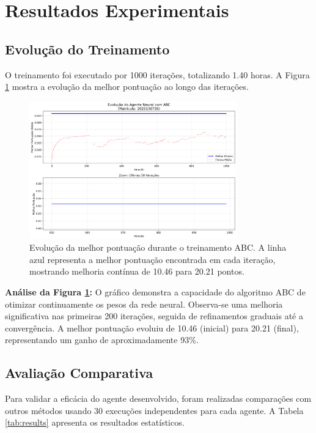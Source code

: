 \documentclass[review]{elsarticle}
\begin{document}
\section{Resultados Experimentais}

\subsection{Evolução do Treinamento}

O treinamento foi executado por 1000 iterações, totalizando 1.40 horas. A Figura \ref{fig:evolution} mostra a evolução da melhor pontuação ao longo das iterações.

\begin{figure}[htbp]
\centering
\includegraphics[width=0.8\textwidth]{training_evolution.png}
\caption{Evolução da melhor pontuação durante o treinamento ABC. A linha azul representa a melhor pontuação encontrada em cada iteração, mostrando melhoria contínua de 10.46 para 20.21 pontos.}
\label{fig:evolution}
\end{figure}

\textbf{Análise da Figura \ref{fig:evolution}:} O gráfico demonstra a capacidade do algoritmo ABC de otimizar continuamente os pesos da rede neural. Observa-se uma melhoria significativa nas primeiras 200 iterações, seguida de refinamentos graduais até a convergência. A melhor pontuação evoluiu de 10.46 (inicial) para 20.21 (final), representando um ganho de aproximadamente 93\%.

\subsection{Avaliação Comparativa}

Para validar a eficácia do agente desenvolvido, foram realizadas comparações com outros métodos usando 30 execuções independentes para cada agente. A Tabela \ref{tab:results} apresenta os resultados estatísticos.
\end{document}

